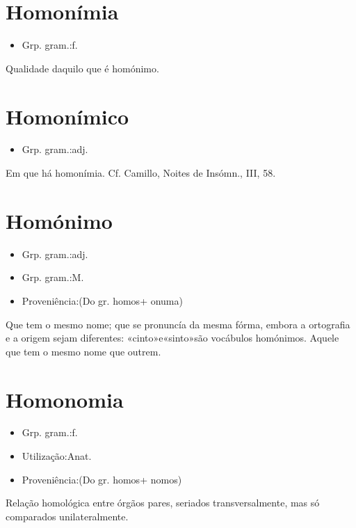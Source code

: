 \documentclass{article}
\begin{document}
\section{Homonímia}
\begin{itemize}
\item {Grp. gram.:f.}
\end{itemize}
Qualidade daquilo que é homónimo.
\section{Homonímico}
\begin{itemize}
\item {Grp. gram.:adj.}
\end{itemize}
Em que há homonímia. Cf. Camillo, \textunderscore Noites de Insómn.\textunderscore , III, 58.
\section{Homónimo}
\begin{itemize}
\item {Grp. gram.:adj.}
\end{itemize}
\begin{itemize}
\item {Grp. gram.:M.}
\end{itemize}
\begin{itemize}
\item {Proveniência:(Do gr. \textunderscore homos\textunderscore  + \textunderscore onuma\textunderscore )}
\end{itemize}
Que tem o mesmo nome; que se pronuncía da mesma fórma, embora a ortografia e a origem sejam diferentes: \textunderscore «cinto»e«sinto»são vocábulos homónimos\textunderscore .
Aquele que tem o mesmo nome que outrem.
\section{Homonomia}
\begin{itemize}
\item {Grp. gram.:f.}
\end{itemize}
\begin{itemize}
\item {Utilização:Anat.}
\end{itemize}
\begin{itemize}
\item {Proveniência:(Do gr. \textunderscore homos\textunderscore  + \textunderscore nomos\textunderscore )}
\end{itemize}
Relação homológica entre órgãos pares, seriados transversalmente, mas só comparados unilateralmente.
\end{document}
